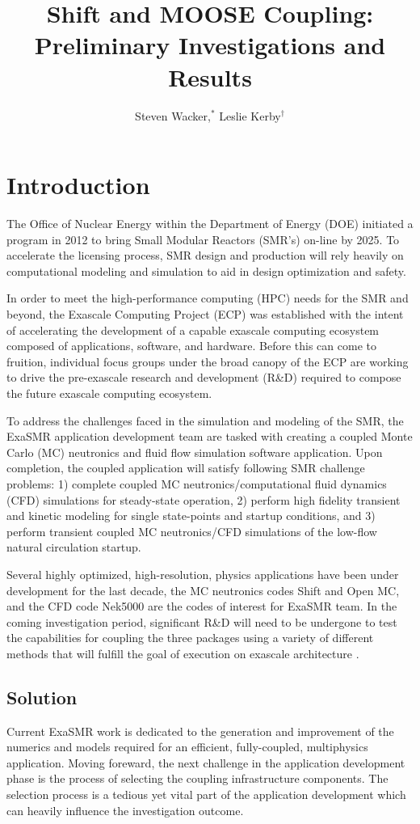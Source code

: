 \documentclass{anstrans}
\title{Shift and MOOSE Coupling: Preliminary Investigations and Results}
\author{Steven Wacker,$^{*}$ Leslie Kerby$^{\dagger}$}
\institute{
$^{*}$ Idaho State University, 921 South 8th Avenue, Pocatello, ID, 83209, wackstev@isu.edu
\and
$^{\dagger}$Idaho National Laboratory, P.O. Box 1625, Idaho Falls, ID 83415, kerblesl@isu.edu
}
\begin{document}
	
\section{Introduction}
  
The Office of Nuclear Energy within the Department of Energy (DOE) initiated a program in 2012 to bring Small Modular Reactors (SMR's) on-line by 2025. To accelerate the licensing process, SMR design and production will rely heavily on computational modeling and simulation to aid in design optimization and safety. 

In order to meet the high-performance computing (HPC) needs for the SMR and beyond, the Exascale Computing Project (ECP) was established with the intent of accelerating the development of a capable exascale computing ecosystem composed of applications, software, and hardware. Before this can come to fruition, individual focus groups under the broad canopy of the ECP are working to drive the pre-exascale research and development (R\&D) required to compose the future exascale computing ecosystem.

To address the challenges faced in the simulation and modeling of the SMR, the ExaSMR application development team are tasked with creating a coupled Monte Carlo (MC) neutronics and fluid flow simulation software application. Upon completion, the coupled application will satisfy following SMR challenge problems: 1) complete coupled MC neutronics/computational fluid dynamics (CFD) simulations for steady-state operation, 2) perform high fidelity transient and kinetic modeling for single state-points and startup conditions, and 3) perform transient coupled MC neutronics/CFD simulations of the low-flow natural circulation startup.

Several highly optimized, high-resolution, physics applications have been under development for the last decade, the MC neutronics codes Shift and Open MC, and the CFD code Nek5000 are the codes of interest for ExaSMR team. In the coming investigation period, significant R\&D will need to be undergone to test the capabilities for coupling the three packages using a variety of different methods that will fulfill the goal of execution on exascale architecture \cite{ExaSMR}. 

\subsection{Solution}
Current ExaSMR work is dedicated to the generation and improvement of the numerics and models required for an efficient, fully-coupled, multiphysics application. Moving foreward, the next challenge in the application development phase is the process of selecting the coupling infrastructure components. The selection process is a tedious yet vital part of the application development which can heavily influence the investigation outcome. 
\end{document}
